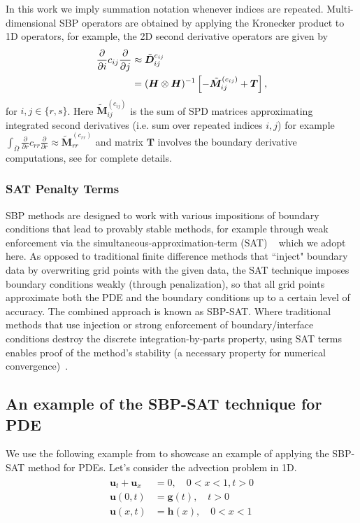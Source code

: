 In this work we imply summation notation whenever indices are repeated. Multi-dimensional SBP operators are obtained by applying the Kronecker product to 1D operators, for example, the 2D second derivative operators are given by
\begin{align}\label{eqn: D2}
  \frac{\partial }{\partial i} c_{ij} \frac{\partial }{\partial j}&\approx \tilde{\boldsymbol{D}}^{c_{ij}}_{ij} \notag \\&= (\boldsymbol{H} \otimes \boldsymbol{H})^{-1}\left[- \tilde{\boldsymbol{M}}^{(c_{ij})}_{ij} + \boldsymbol{T}\right],
\end{align}
for $i, j \in \{r, s\}$.   
Here $\tilde{\boldsymbol{M}}^{(c_{ij})}_{ij}$ is the sum of SPD matrices approximating integrated second derivatives (i.e. sum over repeated indices $i, j$) for example $\int_{\bar\Omega} \frac{\partial}{\partial r} c_{rr} \frac{\partial}{\partial r}  \approx  \tilde{\boldsymbol{M}}^{(c_{rr})}_{rr}$ and matrix $\boldsymbol{T}$ involves the boundary derivative computations, see \cite{Erickson2022} for complete details.
 

\subsubsection{SAT Penalty Terms}
SBP methods are designed to work with various impositions of boundary conditions that lead to provably stable methods, for example through weak enforcement via the simultaneous-approximation-term (SAT) ~\cite{CarpenterGottliebAbarbanel1994} which we adopt here. As opposed to traditional finite difference methods that ``inject" boundary data by overwriting grid points with the given data, the SAT technique imposes boundary conditions weakly (through penalization), so that all grid points approximate both the PDE and the boundary conditions up to a certain level of accuracy.  The combined approach is known as SBP-SAT.
Where traditional methods that use injection or strong enforcement of boundary/interface conditions destroy the discrete integration-by-parts property, using SAT terms enables proof of the method's stability (a necessary property for numerical convergence)~\cite{Mattsson2003}.

\subsection{An example of the SBP-SAT technique for PDE}
We use the following example from \cite{RUGGIU2018216} to showcase an example of applying the SBP-SAT method for PDEs. Let's consider the advection problem in 1D.
\begin{align}
    \begin{split}
    \boldsymbol{u}_t + \boldsymbol{u}_x &= 0, \quad 0 < x < 1,  t > 0 \\
    \boldsymbol{u}(0,t) &=  \boldsymbol{g}(t),  \quad  t > 0 \\
    \boldsymbol{u}(x,t) &= \boldsymbol{h}(x), \quad 0 < x < 1
    \end{split}
     \label{eqn:1d_sbp_problem}
\end{align}

